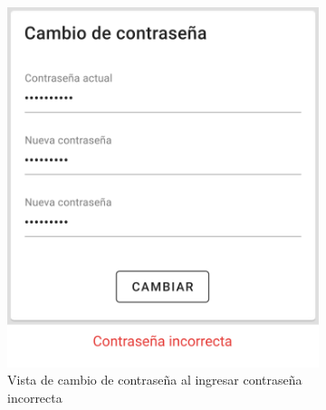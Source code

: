 \begin{figure}[H]
    \centering
    \begin{subfigure}[b]{0.45\textwidth}
        \centering
        \includegraphics[width=\textwidth]{images/app/change-psw-error1.png}
        \caption{Vista de cambio de contraseña al ingresar contraseña incorrecta}
        \label{fig:app-change-psw_error-1}
    \end{subfigure}
    \hfill
    \begin{subfigure}[b]{0.45\textwidth}
        \centering

\end{subfigure}
\end{figure}
